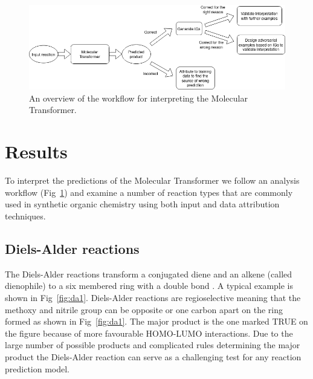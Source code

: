 
\begin{figure}[htbp!] 
\centering    
\includegraphics[width=1.05\textwidth]{Chapters/Ch4/Figs/workflow.png}
\caption[workflow]{An overview of the workflow for interpreting the Molecular Transformer.}
\label{fig:workflow}
\end{figure}

\section{Results}
To interpret the predictions of the Molecular Transformer we follow an analysis workflow (Fig~\ref{fig:workflow}) and examine a number of reaction types that are commonly used in synthetic organic chemistry using both input and data attribution techniques.
\subsection{Diels-Alder reactions}
The Diels-Alder reactions transform a conjugated diene and an alkene (called dienophile) to a six membered ring with a double bond \cite{Clayden2012}. A typical example is shown in Fig~\ref{fig:da1}. Diels-Alder reactions are regioselective meaning that the methoxy and nitrile group can be opposite or one carbon apart on the ring formed as shown in Fig~\ref{fig:da1}. The major product is the one marked TRUE on the figure because of more favourable HOMO-LUMO interactions. Due to the large number of possible products and complicated rules determining the major product the Diels-Alder reaction can serve as a challenging test for any reaction prediction model.


